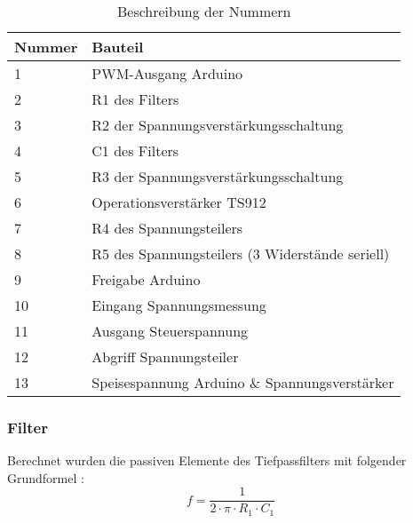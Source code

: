 \begin{table}[ht!]
	\centering
	\begin{tabular}{|l|l|}
		\hline
		Nummer & Bauteil                                                             \\ \hline
		1      & PWM-Ausgang Arduino                                                 \\ \hline
		2      & R1 des Filters                                                      \\ \hline
		3      & R2 der Spannungsverstärkungsschaltung                               \\ \hline
		4      & C1 des Filters                                                      \\ \hline
		5      & R3 der Spannungsverstärkungsschaltung                               \\ \hline
		6      & Operationsverstärker TS912                                          \\ \hline
		7      & R4 des Spannungsteilers 											 \\ \hline
		8      & R5 des Spannungsteilers (3 Widerstände seriell)                     \\ \hline
		9      & Freigabe Arduino                                                    \\ \hline
		10     & Eingang Spannungsmessung                                            \\ \hline
		11     & Ausgang Steuerspannung                                              \\ \hline
		12     & Abgriff Spannungsteiler                                             \\ \hline
		13     & Speisespannung Arduino \& Spannungsverstärker                       \\ \hline
	\end{tabular}
	\caption{Beschreibung der Nummern}
	\label{tab:Laboraufbau}
\end{table}

\newpage
\subsubsection*{Filter}
Berechnet wurden die passiven Elemente des Tiefpassfilters mit folgender Grundformel \cite{Tiefpass}:
\begin{equation}
f = \frac{1}{2 \cdot \pi \cdot R_1 \cdot C_1}
\end{equation}


